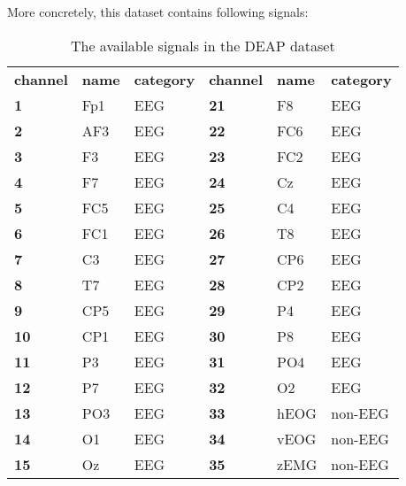 More concretely, this dataset contains following signals:
\begin{table}[]
\centering
\caption{The available signals in the DEAP dataset}
\label{DEAPSignals}
\begin{tabular}{lll|lll}
\textbf{channel} & \textbf{name} & \textbf{category} & \textbf{channel} & \textbf{name}    & \textbf{category} \\
\textbf{1}       & Fp1           & EEG               & \textbf{21}      & F8               & EEG               \\
\textbf{2}       & AF3           & EEG               & \textbf{22}      & FC6              & EEG               \\
\textbf{3}       & F3            & EEG               & \textbf{23}      & FC2              & EEG               \\
\textbf{4}       & F7            & EEG               & \textbf{24}      & Cz               & EEG               \\
\textbf{5}       & FC5           & EEG               & \textbf{25}      & C4               & EEG               \\
\textbf{6}       & FC1           & EEG               & \textbf{26}      & T8               & EEG               \\
\textbf{7}       & C3            & EEG               & \textbf{27}      & CP6              & EEG               \\
\textbf{8}       & T7            & EEG               & \textbf{28}      & CP2              & EEG               \\
\textbf{9}       & CP5           & EEG               & \textbf{29}      & P4               & EEG               \\
\textbf{10}      & CP1           & EEG               & \textbf{30}      & P8               & EEG               \\
\textbf{11}      & P3            & EEG               & \textbf{31}      & PO4              & EEG               \\
\textbf{12}      & P7            & EEG               & \textbf{32}      & O2               & EEG               \\
\textbf{13}      & PO3           & EEG               & \textbf{33}      & hEOG             & non-EEG           \\
\textbf{14}      & O1            & EEG               & \textbf{34}      & vEOG             & non-EEG           \\
\textbf{15}      & Oz            & EEG               & \textbf{35}      & zEMG             & non-EEG           \\

\end{tabular}
\end{table}
